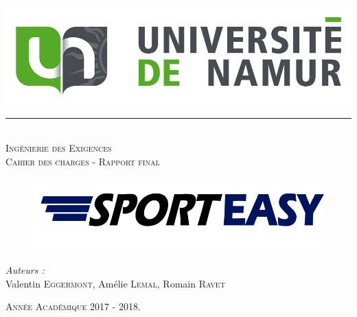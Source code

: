 \begin{titlepage}
\begin{center}

\includegraphics[width=1\textwidth]{unamur_logo.png}
\rule{\linewidth}{0.5mm}\\[0.4cm]  

\vspace{2cm}
\textsc{\LARGE Ingénierie des Exigences}\\[0.5cm]
\textsc{\Large Cahier des charges - Rapport final}\\[0.2cm]

\begin{figure}[!h]
	\centering\includegraphics[width=1\textwidth]{logo.png}
\end{figure}

\vspace{0.5cm}

\emph{Auteurs :}\\
Valentin \textsc{Eggermont}, Amélie \textsc{Lemal}, Romain \textsc{Ravet}

\vfill
\textsc{Année Académique 2017 - 2018.}

\end{center}
\end{titlepage}